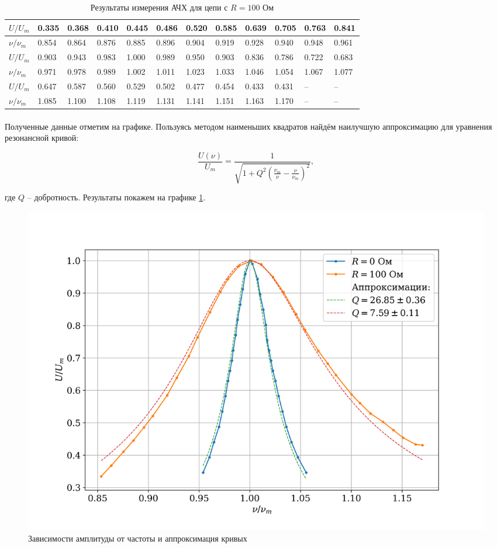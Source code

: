 \documentclass[a4paper,12pt]{article} %
\begin{document}
\begin{table}[h]
\begin{tabularx}{\textwidth}{|X|X|X|X|X|X|X|X|X|X|X|X|}
\hline
$U/U_m$  &   0.335 & 0.368 & 0.410 & 0.445 & 0.486 & 0.520 & 0.585 & 0.639 & 0.705 & 0.763 & 0.841  \\ \hline
$\nu/\nu_m$ & 0.854 & 0.864 & 0.876 & 0.885 & 0.896 & 0.904 & 0.919 & 0.928 & 0.940 & 0.948 & 0.961  \\ \hline
$U/U_m$   &  0.903 & 0.943 & 0.983 & 1.000 & 0.989 & 0.950 & 0.903 & 0.836 & 0.786 & 0.722 & 0.683  \\ \hline
$\nu/\nu_m$  & 0.971 & 0.978 & 0.989 & 1.002 & 1.011 & 1.023 & 1.033 & 1.046 & 1.054 & 1.067 & 1.077  \\ \hline
$U/U_m$   &  0.647 & 0.587 & 0.560 & 0.529 & 0.502 & 0.477 & 0.454 & 0.433 & 0.431  & -- & -- \\ \hline
$\nu/\nu_m$ & 1.085 & 1.100 & 1.108 & 1.119 & 1.131 & 1.141 & 1.151 & 1.163 & 1.170 & --  & -- \\ \hline
\end{tabularx}
\caption{Результаты измерения АЧХ для цепи с $R = 100$ Ом}
\label{tab:2}
\end{table}

\paragraph{} Полученные данные отметим на графике. Пользуясь методом наименьших квадратов найдём наилучшую аппроксимацию для уравнения резонансной кривой:

\[ \frac{U(\nu)}{U_m} = \frac{1}{\sqrt{1 + Q^2 \left( \frac{\nu_m}{\nu} - \frac{\nu}{\nu_m} \right)^2}} ,
\]

\noindent где $Q$ -- добротность. Результаты покажем на графике \ref{graph:1}.

\begin{figure}
\begin{center}
\includegraphics[width=\textwidth]{plot1.png}
\caption{Зависимости амплитуды от частоты и аппроксимация кривых}
\label{graph:1}
\end{center}
\end{figure}
\end{document}
